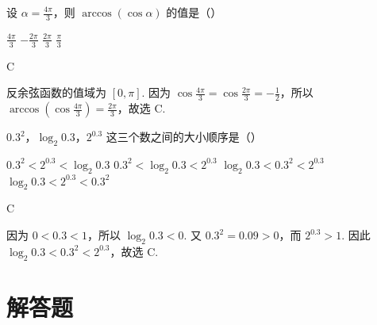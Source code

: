 \documentclass[UTF8,a4paper,oneside,11pt]{ctexbook}
\begin{document}
\begin{problem}
设 \(\alpha = \frac{4\pi}{3}\)，则 \(\arccos\left(\cos\alpha\right)\) 的值是（\quad）

\choices
    {\(\frac{4\pi}{3}\)}
    {\(-\frac{2\pi}{3}\)}
    {\(\frac{2\pi}{3}\)}
    {\(\frac{\pi}{3}\)}

\begin{answer}
C
\end{answer}

\begin{solution}
反余弦函数的值域为 \([0,\pi]\). 因为 \(\cos\frac{4\pi}{3}=\cos\frac{2\pi}{3}=-\frac{1}{2}\)，所以 \(\arccos\left(\cos\frac{4\pi}{3}\right)=\frac{2\pi}{3}\)，故选 C.
\end{solution}
\end{problem}

\begin{problem}
\(0.3^{2}\)，\(\log_{2}0.3\)，\(2^{0.3}\) 这三个数之间的大小顺序是（\quad）

\choices
    {\(0.3^{2} < 2^{0.3} < \log_{2}0.3\)}
    {\(0.3^{2} < \log_{2}0.3 < 2^{0.3}\)}
    {\(\log_{2}0.3 < 0.3^{2} < 2^{0.3}\)}
    {\(\log_{2}0.3 < 2^{0.3} < 0.3^{2}\)}

\begin{answer}
C
\end{answer}

\begin{solution}
因为 \(0<0.3<1\)，所以 \(\log_{2}0.3<0\). 又 \(0.3^{2}=0.09>0\)，而 \(2^{0.3}>1\). 因此 \(\log_{2}0.3<0.3^{2}<2^{0.3}\)，故选 C.
\end{solution}
\end{problem}

\section{解答题}
\end{document}
